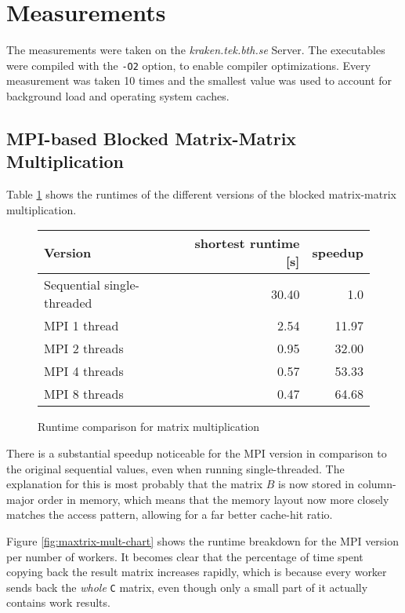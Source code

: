 \documentclass[]{article}
\begin{document}
\section{Measurements}

The measurements were taken on the \emph{kraken.tek.bth.se} Server. The executables were compiled with the \texttt{-O2} option, to enable compiler optimizations. Every measurement was taken 10 times and the smallest value was used to account for background load and operating system caches.

\subsection{MPI-based Blocked Matrix-Matrix Multiplication}

 Table \ref{tab:matrix-mult-runtime} shows the runtimes of the different versions of the blocked matrix-matrix multiplication.

\begin{figure}[h]
	\centering
	\begin{tabular}{|l|r|r|}
		\hline
		\textbf{Version} & \textbf{shortest runtime [s]} & \textbf{speedup} \\
		\hline
		Sequential single-threaded	& 30.40	& 1.0 \\ 
		\hline 
		MPI 1 thread				& 2.54	& 11.97 \\ 
		\hline 
		MPI 2 threads				& 0.95	& 32.00 \\ 
		\hline 
		MPI 4 threads				& 0.57	& 53.33 \\ 
		\hline 
		MPI 8 threads				& 0.47	& 64.68 \\ 
		\hline 
	\end{tabular} 
	\caption{Runtime comparison for matrix multiplication}
	\label{tab:matrix-mult-runtime}
\end{figure}

There is a substantial speedup noticeable for the MPI version in comparison to the original sequential values, even when running single-threaded. The explanation for this is most probably that the matrix $B$ is now stored in column-major order in memory, which means that the memory layout now more closely matches the access pattern, allowing for a far better cache-hit ratio.

Figure \ref{fig:maxtrix-mult-chart} shows the runtime breakdown for the MPI version per number of workers. It becomes clear that the percentage of time spent copying back the result matrix increases rapidly, which is because every worker sends back the \emph{whole} \texttt{C} matrix, even though only a small part of it actually contains work results.
\end{document}
